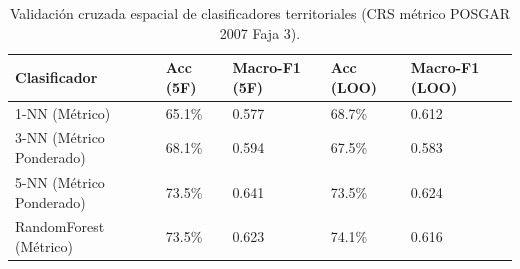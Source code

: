 \begin{table}[htpb]
\centering
\small
\caption{Validación cruzada espacial de clasificadores territoriales (CRS métrico POSGAR 2007 Faja 3).}
\label{tab:clasificadores_regionales_espaciales}
\begin{tabular}{lllll}
\toprule
Clasificador & Acc (5F) & Macro-F1 (5F) & Acc (LOO) & Macro-F1 (LOO) \\
\midrule
1-NN (Métrico) & 65.1\% & 0.577 & 68.7\% & 0.612 \\
3-NN (Métrico Ponderado) & 68.1\% & 0.594 & 67.5\% & 0.583 \\
5-NN (Métrico Ponderado) & 73.5\% & 0.641 & 73.5\% & 0.624 \\
RandomForest (Métrico) & 73.5\% & 0.623 & 74.1\% & 0.616 \\
\bottomrule
\end{tabular}
\end{table}
